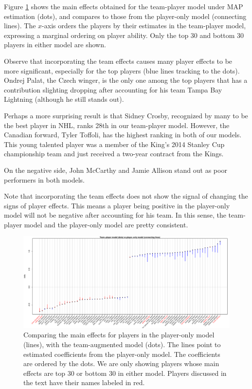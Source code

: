 Figure \ref{fig:pt-p.tb30} shows the main effects obtained for the team-player model under MAP estimation (dots), and compares to those from the player-only model (connecting lines). The $x$-axis orders the players by their estimates in the team-player model, expressing a marginal ordering on player ability. Only the top 30 and bottom 30 players in either model are shown. 

Observe that incorporating the team effects causes many player effects to be more significant, especially for the top players (blue lines tracking to the dots). Ondrej Palat, the Czech winger, is the only one among the top players that has a contribution slighting dropping after accounting for his team Tampa Bay Lightning (although he still stands out). 

Perhaps a more surprising result is that Sidney Crosby, recognized by many to be the best player in NHL, ranks 28th in our team-player model. However, the Canadian forward, Tyler Toffoli, has the highest ranking in both of our models. This young talented player was a member of the King's 2014 Stanley Cup championship team and just received a two-year contract from the Kings. 

On the negative side, John McCarthy and Jamie Allison stand out as poor performers in both models.

Note that incorporating the team effects does not show the signal of changing the signs of player effects. This means a player being positive in the player-only model will not be negative after accounting for his team. In this sense, the team-player model and the player-only model are pretty consistent. 

\begin{figure}[htb!]
	\centering
	\includegraphics[width=\textwidth]{figures/ptvsp_tb30.pdf}
	\caption{Comparing the main effects for players in the player-only model (lines), with the team-augmented model (dots). The lines point to estimated coefficients from the player-only model. The coefficients are ordered by the dots. We are only showing players whose main effects are top 30 or bottom 30 in either model. Players discussed in the text have their names labeled in red.}\label{fig:pt-p.tb30}
\end{figure}

